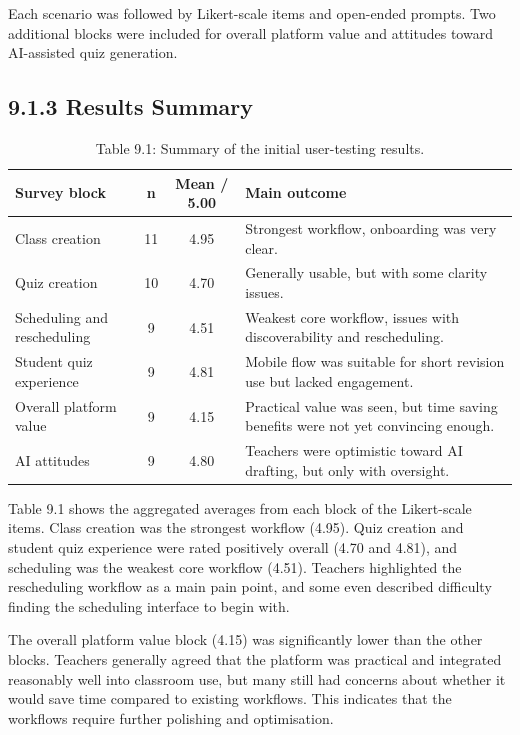 \documentclass[
  12pt,
  a4paper,
]{report}
\begin{document}
Each scenario was followed by Likert-scale items and open-ended prompts.
Two additional blocks were included for overall platform value and
attitudes toward AI-assisted quiz generation.

\hypertarget{quantitative-results-summary}{%
\subsection{9.1.3 Results Summary}\label{quantitative-results-summary}}

\begin{table}[H]
\centering
\small
\begin{tabular}{@{}p{}c c p{}@{}}
\toprule
Survey block & n & Mean / 5.00 & Main outcome \\
\midrule
Class creation & 11 & 4.95 & Strongest workflow, onboarding was very clear. \\
Quiz creation & 10 & 4.70 & Generally usable, but with some clarity issues. \\
Scheduling and rescheduling & 9 & 4.51 & Weakest core workflow, issues with discoverability and rescheduling. \\
Student quiz experience & 9 & 4.81 & Mobile flow was suitable for short revision use but lacked engagement. \\
Overall platform value & 9 & 4.15 & Practical value was seen, but time saving benefits were not yet convincing enough. \\
AI attitudes & 9 & 4.80 & Teachers were optimistic toward AI drafting, but only with oversight. \\
\bottomrule
\end{tabular}
\caption*{Table 9.1: Summary of the initial user-testing results.}
\end{table}

Table 9.1 shows the aggregated averages from each block of the Likert-scale items.
Class creation was the strongest workflow (4.95).
Quiz creation and student quiz experience were rated positively
overall (4.70 and 4.81), and scheduling was the weakest core workflow
(4.51). Teachers highlighted the rescheduling workflow as a main pain
point, and some even described difficulty finding the scheduling
interface to begin with.

The overall platform value block (4.15) was significantly lower than the
other blocks. Teachers generally agreed that the platform was practical
and integrated reasonably well into classroom use, but many still had
concerns about whether it would save time compared to existing
workflows. This indicates that the workflows require further polishing
and optimisation.
\end{document}
